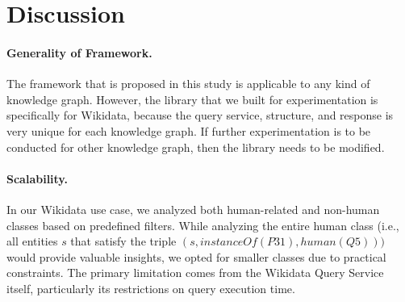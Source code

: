 \section{Discussion}

\paragraph{Generality of Framework.}
The framework that is proposed in this study is applicable to any kind of knowledge graph. However, the library that we built for experimentation is specifically for Wikidata, because the query service, structure, and response is very unique for each knowledge graph. If further experimentation is to be conducted for other knowledge graph, then the library needs to be modified.

\paragraph{Scalability.}

In our Wikidata use case, we analyzed both human-related and non-human classes based on predefined filters. While analyzing the entire human class (i.e., all entities \(s\) that satisfy the triple 
\((s,instanceOf(P31),human(Q5)))\) would provide valuable insights, we opted for smaller classes due to practical constraints. The primary limitation comes from the Wikidata Query Service itself, particularly its restrictions on query execution time.

